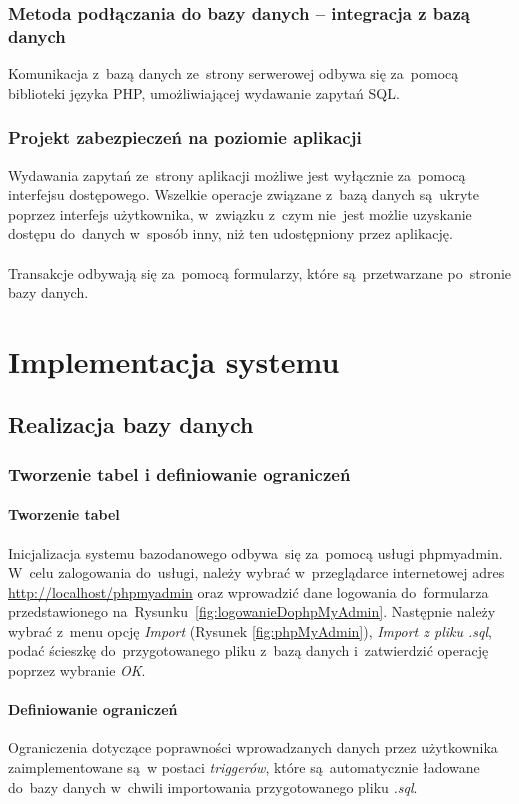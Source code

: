 \documentclass[a4paper, 12pt]{article}
\begin{document}
\subsubsection{Metoda podłączania do bazy danych – integracja z bazą danych}
Komunikacja z~bazą danych ze~strony serwerowej odbywa się za~pomocą biblioteki języka PHP, umożliwiającej wydawanie zapytań SQL.
\subsubsection{Projekt zabezpieczeń na poziomie aplikacji}
Wydawania zapytań ze~strony aplikacji możliwe jest wyłącznie za~pomocą interfejsu dostępowego. Wszelkie operacje związane z~bazą danych są~ukryte poprzez interfejs użytkownika, w~związku z~czym nie~jest możlie uzyskanie dostępu do~danych w~sposób inny, niż ten udostępniony przez aplikację.\\\\
Transakcje odbywają się za~pomocą formularzy, które są~przetwarzane po~stronie bazy danych.

\section{Implementacja systemu}
\subsection{Realizacja bazy danych}
\subsubsection{Tworzenie tabel i definiowanie ograniczeń}
\paragraph{Tworzenie tabel}
Inicjalizacja systemu bazodanowego odbywa~się za~pomocą usługi phpmyadmin. W~celu zalogowania do~usługi, należy wybrać w~przeglądarce internetowej adres \url{http://localhost/phpmyadmin} oraz wprowadzić dane logowania do~formularza przedstawionego na~Rysunku~\ref{fig:logowanieDophpMyAdmin}. Następnie należy wybrać z~menu opcję \textit{Import} (Rysunek \ref{fig:phpMyAdmin}), \textit{Import z pliku .sql}, podać ścieszkę do~przygotowanego pliku z~bazą danych i~zatwierdzić operację poprzez wybranie \textit{OK}.

\paragraph{Definiowanie ograniczeń}
Ograniczenia dotyczące poprawności wprowadzanych danych przez użytkownika zaimplementowane są~w postaci \textit{triggerów}, które są~automatycznie ładowane do~bazy danych w~chwili importowania przygotowanego pliku \textit{.sql}.
\end{document}
